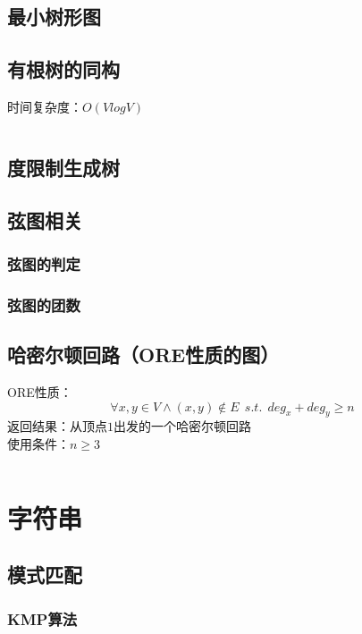 \documentclass[a4paper]{article}
\newcommand{\cppcode}[1]{
    \inputminted[mathescape]{cpp}{source/#1}
}
\begin{document}
\subsection{最小树形图}

\subsection{有根树的同构}

时间复杂度：$O(V log V)$

\cppcode{graph-theory/rooted-tree-isomorphism.cpp}

\subsection{度限制生成树}

\subsection{弦图相关}

\subsubsection{弦图的判定}

\subsubsection{弦图的团数}

\subsection{哈密尔顿回路（ORE性质的图）}

ORE性质：$$\forall x,y \in V \wedge (x,y) \notin E \ \ s.t. \ \ deg_x+deg_y \geq n$$
\indent 返回结果：从顶点$1$出发的一个哈密尔顿回路\\
\indent 使用条件：$n \geq 3$

\cppcode{graph-theory/hamiltonian-circuit-ore.cpp}

\section{字符串}

\subsection{模式匹配}

\subsubsection{KMP算法}
\end{document}
